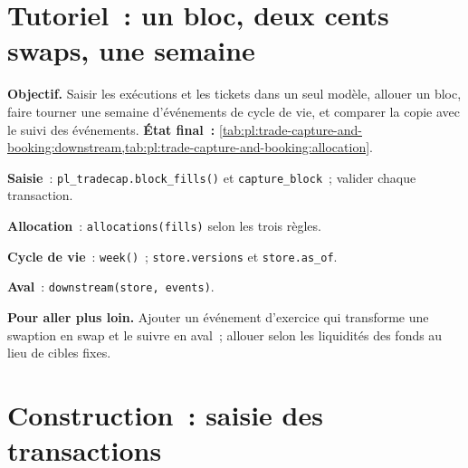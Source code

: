 \section{Tutoriel~: un bloc, deux cents swaps, une semaine}\label{tut:pl:trade-capture-and-booking:tut}

\begin{tutorial}
\textbf{Objectif.} Saisir les exécutions et les tickets dans un seul modèle, allouer un bloc, faire tourner une semaine d'événements de cycle de vie, et comparer la copie avec
le suivi des événements. \textbf{État final~:} \cref{tab:pl:trade-capture-and-booking:downstream,tab:pl:trade-capture-and-booking:allocation}.
\begin{tutsteps}
\item \textbf{Saisie}~: \texttt{pl\_tradecap.block\_fills()} et \texttt{capture\_block}~; valider chaque transaction.
\item \textbf{Allocation}~: \texttt{allocations(fills)} selon les trois règles.
\item \textbf{Cycle de vie}~: \texttt{week()}~; \texttt{store.versions} et \texttt{store.as\_of}.
\item \textbf{Aval}~: \texttt{downstream(store, events)}.
\end{tutsteps}
\textbf{Pour aller plus loin.} Ajouter un événement d'exercice qui transforme une swaption en swap et le suivre en aval~; allouer selon les liquidités des
fonds au lieu de cibles fixes.
\end{tutorial}

\section{Construction~: saisie des transactions}\label{bld:pl:trade-capture-and-booking:tradecap}

